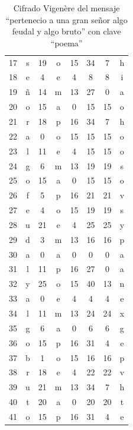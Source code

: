 \begin{itemize}
\begin{table}[H]
\begin{tabular}{|c|c|c|c|c|c|c|c|}
            17 & s & 19 & o & 15 & 34 & 7  & h \\
            18 & e & 4  & e & 4  & 8  & 8  & i \\
            19 & \~{n} & 14 & m & 13 & 27 & 0  & a \\
            20 & o & 15 & a & 0  & 15 & 15 & o \\
            21 & r & 18 & p & 16 & 34 & 7  & h \\
            22 & a & 0  & o & 15 & 15 & 15 & o \\
            23 & l & 11 & e & 4  & 15 & 15 & o \\
            24 & g & 6  & m & 13 & 19 & 19 & s \\
            25 & o & 15 & a & 0  & 15 & 15 & o \\
            26 & f & 5  & p & 16 & 21 & 21 & v \\
            27 & e & 4  & o & 15 & 19 & 19 & s \\
            28 & u & 21 & e & 4  & 25 & 25 & y \\
            29 & d & 3  & m & 13 & 16 & 16 & p \\
            30 & a & 0  & a & 0  & 0  & 0  & a \\
            31 & l & 11 & p & 16 & 27 & 0  & a \\
            32 & y & 25 & o & 15 & 40 & 13 & n \\
            33 & a & 0  & e & 4  & 4  & 4  & e \\
            34 & l & 11 & m & 13 & 24 & 24 & x \\
            35 & g & 6  & a & 0  & 6  & 6  & g \\
            36 & o & 15 & p & 16 & 31 & 4  & e \\
            37 & b & 1  & o & 15 & 16 & 16 & p \\
            38 & r & 18 & e & 4  & 22 & 22 & v \\
            39 & u & 21 & m & 13 & 34 & 7  & h \\
            40 & t & 20 & a & 0  & 20 & 20 & t \\
            41 & o & 15 & p & 16 & 31 & 4  & e \\
            \hline
            \end{tabular}
            \caption{Cifrado Vigen\`{e}re del mensaje ``pertenecio a una gran
            se\~{n}or algo feudal y algo bruto'' con clave ``poema''}
            \label{tab:vigenere_cifrado}
            \end{table}


\end{itemize}
